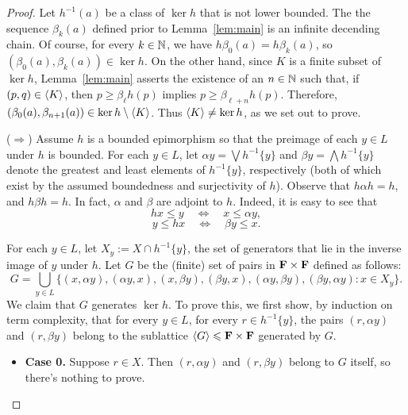 \begin{proof}
  Let $h^{-1}(a)$ be a class of $\ker h$ that is not lower bounded.
  The the sequence $\beta_k(a)$ defined prior to Lemma~\ref{lem:main}
  is an infinite decending chain.  Of course, for every $k\in \mathbb{N}$, 
  we have $h \beta_0(a) = h \beta_k(a)$, so 
  $(\beta_0(a), \beta_k(a)) \in \ker h$. 
  On the other hand, since $K$ is a finite subset of $\ker h$, 
  Lemma~\ref{lem:main} asserts the existence of 
  an $n\in \mathbb{N}$ such that, if $(p,q) \in \langle K\rangle$, then
  $p\geq \beta_\ell h(p)$ implies $p\geq \beta_{\ell +n} h(p)$.
  Therefore, $(\beta_0(a), \beta_{n+1}(a)) \in \ker h \setminus \langle K\rangle$. 
  Thus $\langle K\rangle\neq \ker h$, as we set out to prove.


\medskip

  \noindent ($\Rightarrow$)
  Assume $h$ is a bounded epimorphism so that the preimage of each 
  $y\in L$ under $h$ is bounded.  For each $y\in L$, let 
  $\alpha y= \bigvee h^{-1}\{y\}$ and $\beta y = \bigwedge h^{-1}\{y\}$ 
  denote the greatest and least elements of $h^{-1}\{y\}$, respectively 
  (both of which exist by the assumed boundedness and surjectivity of $h$).  
  Observe that $h \alpha h = h$, and $h \beta h = h$. In fact, $\alpha$ 
  and $\beta$ are adjoint to $h$. Indeed, it is easy to see that
  \[
  h x \leqslant y \quad \Leftrightarrow \quad x \leqslant \alpha y,
  \]
  \[
  y \leqslant h x \quad \Leftrightarrow \quad \beta y \leqslant x.
  \]

For each $y \in L$, let $X_y := X\cap h^{-1}\{y\}$, the set of generators 
that lie in the inverse image of $y$ under $h$.
Let $G$ be the (finite) set of pairs in $\mathbf{F} \times \mathbf{F}$ defined 
as follows:
\[
G = \bigcup_{y \in L}\{(x, \alpha y), (\alpha y, x), (x, \beta y), 
                       (\beta y, x), (\alpha y, \beta y), 
                       (\beta y, \alpha y) : x \in X_y\}.
\]
We claim that $G$ generates $\ker h$.  To prove this, we first show, by 
induction on term complexity, that for every $y \in L$, for every 
$r \in h^{-1}\{y\}$, the pairs $(r,\alpha y)$ and $(r,\beta y)$ belong 
to the sublattice $\langle G \rangle \leqslant \mathbf{F} \times \mathbf{F}$ 
generated by $G$.

\begin{itemize}
  \item {\bf Case 0.} Suppose $r \in X$. Then $(r,\alpha y)$ and $(r,\beta y)$ 
  belong to $G$ itself, so there's nothing to prove.  


\end{itemize}
\end{proof}
